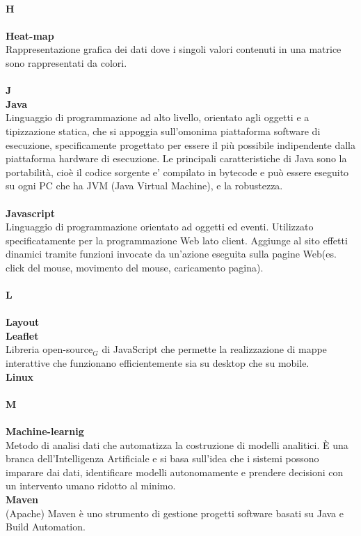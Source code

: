 \\
\textbf{H}\\
\\
\textbf{Heat-map}\\
Rappresentazione grafica dei dati dove i singoli valori contenuti in una matrice sono rappresentati da colori.\\
\\
\textbf{J}
\\
\textbf{Java}\\
Linguaggio di programmazione ad alto livello, orientato agli oggetti e a tipizzazione statica, che si appoggia sull'omonima piattaforma software di esecuzione, specificamente progettato per essere il più possibile indipendente dalla piattaforma hardware di esecuzione. Le principali caratteristiche di Java sono la portabilità, cioè il codice sorgente e' compilato in bytecode e può essere eseguito su ogni PC che ha JVM (Java Virtual Machine), e la robustezza.\\
\\
\textbf{Javascript}\\
Linguaggio di programmazione orientato ad oggetti ed eventi.
Utilizzato specificatamente per la programmazione Web lato client.
Aggiunge al sito effetti dinamici tramite funzioni invocate da un'azione eseguita sulla pagine Web(es. click del mouse, movimento del mouse, caricamento pagina).\\
\\
\textbf{L}\\
\\
\textbf{Layout}\\
\textbf{Leaflet}\\
Libreria open-source$_G$ di JavaScript che permette la realizzazione di mappe interattive che funzionano efficientemente sia su desktop che su mobile.\\
\textbf{Linux}\\
\\
\textbf{M}\\
\\
\textbf{Machine-learnig}\\
Metodo di analisi dati che automatizza la costruzione di modelli analitici. È una branca dell'Intelligenza Artificiale e si basa sull'idea che i sistemi possono imparare dai dati, identificare modelli autonomamente e prendere decisioni con un intervento umano ridotto al minimo.\\
\textbf{Maven}\\
(Apache) Maven è uno strumento di gestione progetti software basati su Java e Build Automation.
